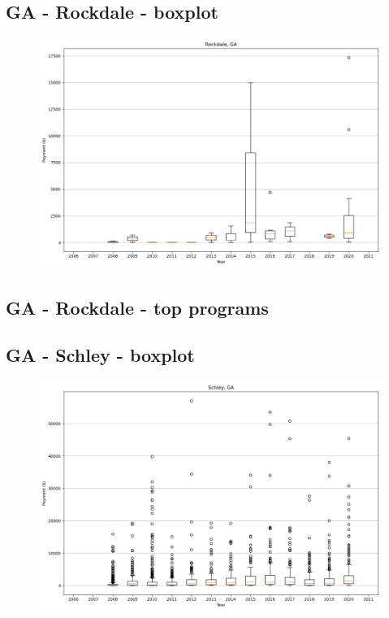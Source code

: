 \subsection*{GA - Rockdale - boxplot}
\begin{figure}[h]
\centering
\includegraphics[width=7in]{../output/boxplots/counties/Rockdale-GA_boxplot.png}
\end{figure}


\subsection*{GA - Rockdale - top programs}

\newpage
\subsection*{GA - Schley - boxplot}
\begin{figure}[h]
\centering
\includegraphics[width=7in]{../output/boxplots/counties/Schley-GA_boxplot.png}
\end{figure}


